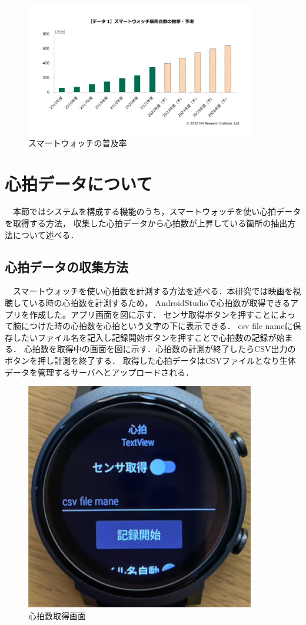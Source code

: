 \begin{figure}[H]
    \centering
    \includegraphics[width=10cm]{images/chapter3/watchreserch.png}
    \caption{スマートウォッチの普及率}
\end{figure}

\section{心拍データについて}

　本節ではシステムを構成する機能のうち，スマートウォッチを使い心拍データを取得する方法，
収集した心拍データから心拍数が上昇している箇所の抽出方法について述べる．

\subsection{心拍データの収集方法}

　スマートウォッチを使い心拍数を計測する方法を述べる．本研究では映画を視聴している時の心拍数を計測するため，
AndroidStudioで心拍数が取得できるアプリを作成した。アプリ画面を図に示す．
センサ取得ボタンを押すことによって腕につけた時の心拍数を心拍という文字の下に表示できる．
csv file nameに保存したいファイル名を記入し記録開始ボタンを押すことで心拍数の記録が始まる．
心拍数を取得中の画面を図に示す．心拍数の計測が終了したらCSV出力のボタンを押し計測を終了する．
取得した心拍データはCSVファイルとなり生体データを管理するサーバへとアップロードされる．

\begin{figure}[H]
    \centering
    \includegraphics[width=10cm]{images/chapter3/tokei_real.png}
    \caption{心拍数取得画面}
\end{figure}

